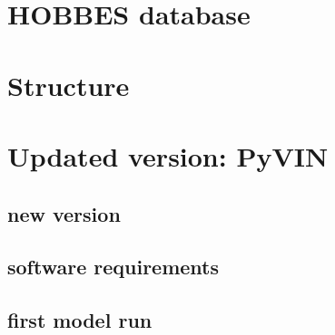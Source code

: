 \documentclass[12pt]{article}%
\begin{document}
\section{HOBBES database}
%
\section{Structure}
%
\section{Updated version: PyVIN}
%
\subsection{new version}
%
\subsection{software requirements}
%
\subsection{first model run}
\end{document}
